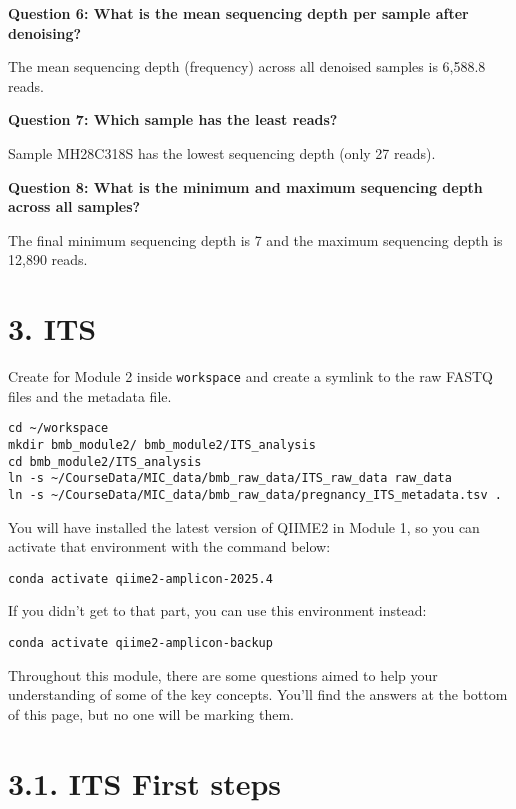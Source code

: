 \documentclass[
]{book}
\begin{document}
\textbf{Question 6: What is the mean sequencing depth per sample after denoising?}

The mean sequencing depth (frequency) across all denoised samples is 6,588.8 reads.

\textbf{Question 7: Which sample has the least reads?}

Sample MH28C318S has the lowest sequencing depth (only 27 reads).

\textbf{Question 8: What is the minimum and maximum sequencing depth across all samples?}

The final minimum sequencing depth is 7 and the maximum sequencing depth is 12,890 reads.

\section{3. ITS}\label{its}

Create for Module 2 inside \texttt{workspace} and create a symlink to the raw FASTQ files and the metadata file.

\begin{verbatim}
cd ~/workspace
mkdir bmb_module2/ bmb_module2/ITS_analysis
cd bmb_module2/ITS_analysis
ln -s ~/CourseData/MIC_data/bmb_raw_data/ITS_raw_data raw_data
ln -s ~/CourseData/MIC_data/bmb_raw_data/pregnancy_ITS_metadata.tsv .
\end{verbatim}

You will have installed the latest version of QIIME2 in Module 1, so you can activate that environment with the command below:

\begin{verbatim}
conda activate qiime2-amplicon-2025.4
\end{verbatim}

If you didn't get to that part, you can use this environment instead:

\begin{verbatim}
conda activate qiime2-amplicon-backup
\end{verbatim}

Throughout this module, there are some questions aimed to help your understanding of some of the key concepts. You'll find the answers at the bottom of this page, but no one will be marking them.

\section{3.1. ITS First steps}\label{its-first-steps}
\end{document}
